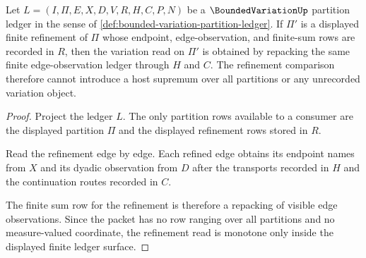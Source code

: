 \begin{theorem}
\label{thm:bounded-variation-partition-refinement-monotonicity}
Let $L=(I,\Pi,E,X,D,V,R,H,C,P,N)$ be a
$\BoundedVariationUp$ partition ledger in the sense of
\autoref{def:bounded-variation-partition-ledger}. If $\Pi'$ is a displayed
finite refinement of $\Pi$ whose endpoint, edge-observation, and finite-sum
rows are recorded in $R$, then the variation read on $\Pi'$ is obtained by
repacking the same finite edge-observation ledger through $H$ and $C$. The
refinement comparison therefore cannot introduce a host supremum over all
partitions or any unrecorded variation object.
\end{theorem}
\begin{proof}
Project the ledger $L$. The only partition rows available to a consumer are the
displayed partition $\Pi$ and the displayed refinement rows stored in $R$.

Read the refinement edge by edge. Each refined edge obtains its endpoint names
from $X$ and its dyadic observation from $D$ after the transports recorded in
$H$ and the continuation routes recorded in $C$.

The finite sum row for the refinement is therefore a repacking of visible edge
observations. Since the packet has no row ranging over all partitions and no
measure-valued coordinate, the refinement read is monotone only inside the
displayed finite ledger surface.
\end{proof}

